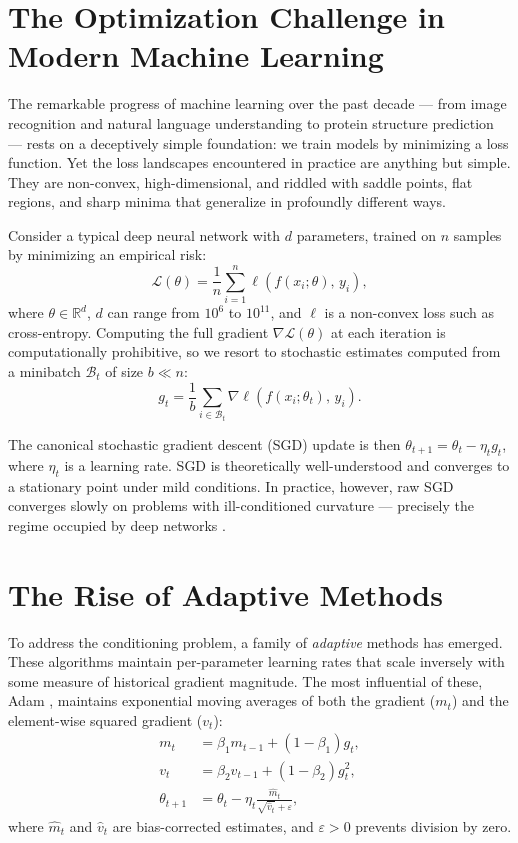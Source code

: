 \documentclass[11pt,twoside,openright]{book}
\begin{document}
\section{The Optimization Challenge in Modern Machine Learning}

The remarkable progress of machine learning over the past decade — from image recognition
\cite{krizhevsky2012} and natural language understanding \cite{vaswani2017} to protein structure
prediction \cite{jumper2021} — rests on a deceptively simple foundation: we train models by
minimizing a loss function. Yet the loss landscapes encountered in practice are anything but
simple. They are non-convex, high-dimensional, and riddled with saddle points, flat regions, and
sharp minima that generalize in profoundly different ways.

Consider a typical deep neural network with $d$ parameters, trained on $n$ samples by minimizing
an empirical risk:
\begin{equation}
  \mathcal{L}(\theta) = \frac{1}{n}\sum_{i=1}^{n} \ell(f(x_i;\theta),\, y_i),
  \label{eq:erm}
\end{equation}
where $\theta \in \mathbb{R}^d$, $d$ can range from $10^6$ to $10^{11}$, and $\ell$ is a
non-convex loss such as cross-entropy. Computing the full gradient $\nabla\mathcal{L}(\theta)$
at each iteration is computationally prohibitive, so we resort to stochastic estimates computed
from a minibatch $\mathcal{B}_t$ of size $b \ll n$:
\begin{equation}
  g_t = \frac{1}{b}\sum_{i \in \mathcal{B}_t} \nabla\ell(f(x_i;\theta_t),\, y_i).
  \label{eq:sg}
\end{equation}

The canonical stochastic gradient descent (SGD) update \cite{robbins1951} is then
$\theta_{t+1} = \theta_t - \eta_t g_t$, where $\eta_t$ is a learning rate. SGD is theoretically
well-understood and converges to a stationary point under mild conditions. In practice, however,
raw SGD converges slowly on problems with ill-conditioned curvature — precisely the regime
occupied by deep networks \cite{goodfellow2016}.

\section{The Rise of Adaptive Methods}

To address the conditioning problem, a family of \emph{adaptive} methods has emerged. These
algorithms maintain per-parameter learning rates that scale inversely with some measure of
historical gradient magnitude. The most influential of these, Adam \cite{kingma2015}, maintains
exponential moving averages of both the gradient ($m_t$) and the element-wise squared gradient
($v_t$):
\begin{align}
  m_t &= \beta_1 m_{t-1} + (1-\beta_1) g_t, \label{eq:adam_m}\\
  v_t &= \beta_2 v_{t-1} + (1-\beta_2) g_t^2, \label{eq:adam_v}\\
  \theta_{t+1} &= \theta_t - \eta_t \frac{\hat{m}_t}{\sqrt{\hat{v}_t} + \varepsilon},
  \label{eq:adam_update}
\end{align}
where $\hat{m}_t$ and $\hat{v}_t$ are bias-corrected estimates, and $\varepsilon > 0$ prevents
division by zero.
\end{document}
